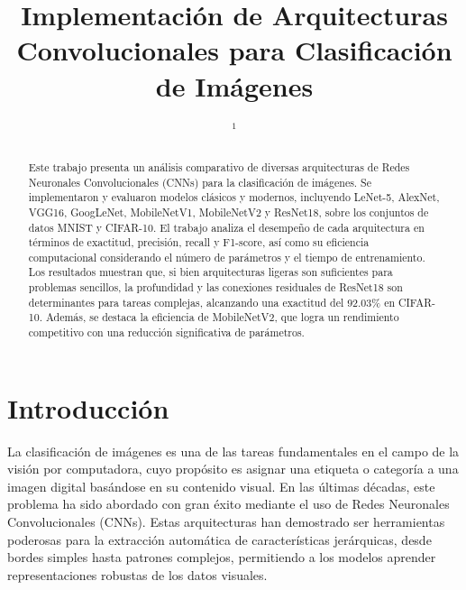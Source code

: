 \documentclass{pas}
\begin{document}



\title{Implementación de Arquitecturas Convolucionales para Clasificación de Imágenes}

\author{ $^{1}$}





\begin{abstract}
Este trabajo presenta un análisis comparativo de diversas arquitecturas de Redes Neuronales Convolucionales (CNNs) para la clasificación de imágenes. Se implementaron y evaluaron modelos clásicos y modernos, incluyendo LeNet-5, AlexNet, VGG16, GoogLeNet, MobileNetV1, MobileNetV2 y ResNet18, sobre los conjuntos de datos MNIST y CIFAR-10. El trabajo analiza el desempeño de cada arquitectura en términos de exactitud, precisión, recall y F1-score, así como su eficiencia computacional considerando el número de parámetros y el tiempo de entrenamiento. Los resultados muestran que, si bien arquitecturas ligeras son suficientes para problemas sencillos, la profundidad y las conexiones residuales de ResNet18 son determinantes para tareas complejas, alcanzando una exactitud del 92.03\% en CIFAR-10. Además, se destaca la eficiencia de MobileNetV2, que logra un rendimiento competitivo con una reducción significativa de parámetros.
\end{abstract}


\maketitle

\section{Introducción}

La clasificación de imágenes es una de las tareas fundamentales en el campo de la visión por computadora, cuyo propósito es asignar una etiqueta o categoría a una imagen digital basándose en su contenido visual. En las últimas décadas, este problema ha sido abordado con gran éxito mediante el uso de Redes Neuronales Convolucionales (CNNs). Estas arquitecturas han demostrado ser herramientas poderosas para la extracción automática de características jerárquicas, desde bordes simples hasta patrones complejos, permitiendo a los modelos aprender representaciones robustas de los datos visuales.
\end{document}
